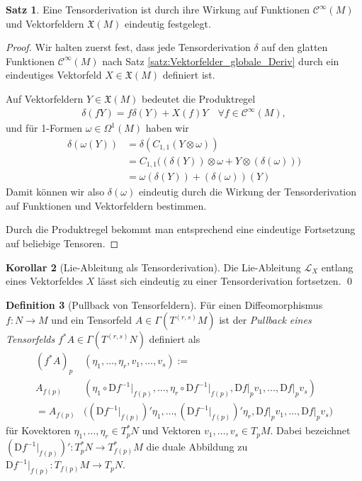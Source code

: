 \documentclass[a4paper]{scrbook}
\numberwithin{equation}{chapter}
\newcommand{\DD}{\mathrm{D}}
\newcommand{\sC}{\mathcal{C}^{\infty}}
\newcommand{\vf}{\mathfrak{X}}
\theoremstyle{definition}
\newtheorem{defn}{Definition}[section]
\newtheorem{satz}[defn]{Satz}
\newtheorem{kor}[defn]{Korollar}
\begin{document}
		\begin{satz}\label{satz:Fortsetzung_Derivationen}
			Eine Tensorderivation ist durch ihre Wirkung auf Funktionen $\sC(M)$ und Vektorfeldern $\vf(M)$ eindeutig festgelegt.
			\begin{proof}
				Wir halten zuerst fest, dass jede Tensorderivation $\delta$ auf den glatten Funktionen $\sC(M)$ nach Satz \ref{satz:Vektorfelder_globale_Deriv} durch ein eindeutiges Vektorfeld $X\in\vf(M)$ definiert ist.
				
				Auf Vektorfeldern $Y\in\vf(M)$ bedeutet die Produktregel
				\begin{align*}
					\delta(fY)=f\delta(Y)+X(f)Y \quad\forall f\in\sC(M),
				\end{align*}
				und für 1-Formen $\omega\in\Omega^1(M)$ haben wir
				\begin{align*}
					\delta(\omega(Y)) &= \delta(C_{1,1}(Y\otimes\omega))\\
					&= C_{1,1}\Big( (\delta(Y))\otimes\omega + Y\otimes(\delta(\omega)) \Big)\\
					&= \omega(\delta(Y)) + (\delta(\omega))(Y)
				\end{align*}
				Damit können wir also $\delta(\omega)$ eindeutig durch die Wirkung der Tensorderivation auf Funktionen und Vektorfeldern bestimmen.
				
				Durch die Produktregel bekommt man entsprechend eine eindeutige Fortsetzung auf beliebige Tensoren.
			\end{proof}
		\end{satz}
		
		\begin{kor}[Lie-Ableitung als Tensorderivation]
			Die Lie-Ableitung $\mathcal{L}_X$ entlang eines Vektorfeldes $X$ lässt sich eindeutig zu einer Tensorderivation fortsetzen. \qed
		\end{kor}
		
		\begin{defn}[Pullback von Tensorfeldern]
			Für einen Diffeomorphismus $f\colon N\rightarrow M$ und ein Tensorfeld $A\in \Gamma(T^{(r,s)}M)$ ist der \emph{Pullback eines Tensorfelds} $f^*A\in\Gamma(T^{(r,s)}N)$ definiert als
			\begin{align*}
				(f^*A)_p&(\eta_1,\ldots,\eta_r,v_1,\ldots,v_s):=\\
				A_{f(p)}&(\eta_1\circ\DD f^{-1}\vert_{f(p)},\ldots,\eta_r\circ\DD f^{-1}\vert_{f(p)},\DD f\vert_pv_1,\ldots,\DD f\vert_pv_s)\\
				= A_{f(p)}& \Big((\DD f^{-1}\vert_{f(p)})' \eta_1, \ldots, (\DD f^{-1}\vert_{f(p)})' \eta_r, \DD f\vert_pv_1,\ldots,\DD f\vert_pv_s \Big)
			\end{align*}
			für Kovektoren $\eta_1,\dots,\eta_r \in T_p^*N$ und Vektoren $v_1,\dots,v_s \in T_pM$. Dabei bezeichnet $(\DD f^{-1}\vert_{f(p)})' \colon T_p^*N \to T_{f(p)}^*M$ die duale Abbildung zu $\DD f^{-1}\vert_{f(p)}\colon T_{f(p)}M \to T_pN$.
		\end{defn}
		
\end{document}
